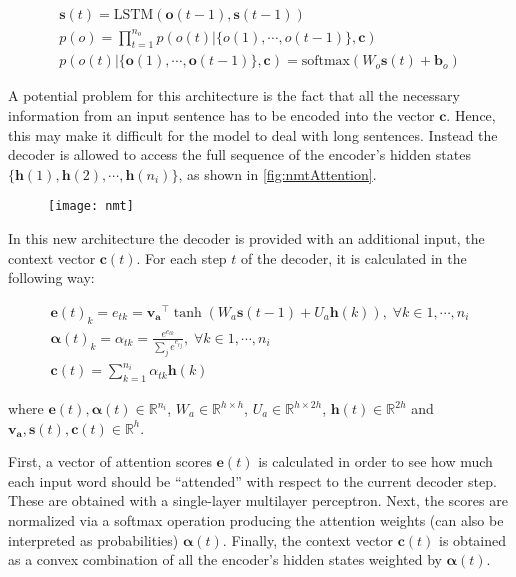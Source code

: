 \begin{equation} \label{eq:decoder}
	\begin{gathered}
		\mathbf{s}(t) = \text{LSTM}(\mathbf{o}(t-1), \mathbf{s}(t-1)) \\
		p(o) = \prod_{t=1}^{n_o} p(o(t)|\{o(1), \cdots, o(t-1)\}, \mathbf{c}) \\
		p(o(t)|\{\mathbf{o}(1), \cdots, \mathbf{o}(t-1)\}, \mathbf{c}) = \text{softmax}(W_o \mathbf{s}(t) +\textbf{b}_o)
	\end{gathered}
\end{equation}

A potential problem for this architecture is the fact that all the necessary information from an input sentence has to be encoded into the vector $\mathbf{c}$. Hence, this may make it difficult for the model to deal with long sentences. Instead the decoder is allowed to access the full sequence of the encoder's hidden states $\{\mathbf{h}(1), \mathbf{h}(2), \cdots, \mathbf{h}(n_i)\}$, as shown in \autoref{fig:nmtAttention}.

\begin{figure}[H]
	\centering
	\texttt{[image: nmt]}
	\label{fig:nmtAttention}
\end{figure}

In this new architecture the decoder is provided with an additional input, the context vector $\mathbf{c}(t)$. For each step $t$ of the decoder, it is calculated in the following way:

\begin{equation} \label{eq:nmtAttention}
	\begin{gathered}
		\mathbf{e}(t)_k = e_{tk} = \mathbf{v_a}^{\top} \tanh(W_a \mathbf{s}(t-1)+U_a\mathbf{h}(k)), \; \forall k \in 1, \cdots , n_i  \\
		\boldsymbol{\alpha}(t)_k = \alpha_{tk} = \frac{e^{e_{tk}}}{\sum_{j}e^{e_{tj}}}, \; \forall k \in 1, \cdots , n_i  \\
		\mathbf{c}(t) = \sum_{k=1}^{n_i} \alpha_{tk} \mathbf{h}(k)
	\end{gathered}
\end{equation}

where $\mathbf{e}(t),\boldsymbol{\alpha}(t) \in \mathbb{R}^{n_i}$, $W_a \in \mathbb{R}^{h \times h}$, $U_a \in \mathbb{R}^{h \times 2h}$, $\mathbf{h}(t) \in \mathbb{R}^{2h}$ and $\mathbf{v_a},\mathbf{s}(t),\mathbf{c}(t) \in \mathbb{R}^{h}$. 

First, a vector of attention scores $\mathbf{e}(t)$ is calculated in order to see how much each input word should be ``attended'' with respect to the current decoder step. These are obtained with a single-layer multilayer perceptron. Next, the scores are normalized via a softmax operation producing the attention weights (can also be interpreted as probabilities)  $\boldsymbol{\alpha}(t)$. Finally, the context vector $\mathbf{c}(t)$ is obtained as a convex combination of all the encoder's hidden states weighted by $\boldsymbol{\alpha}(t)$.

